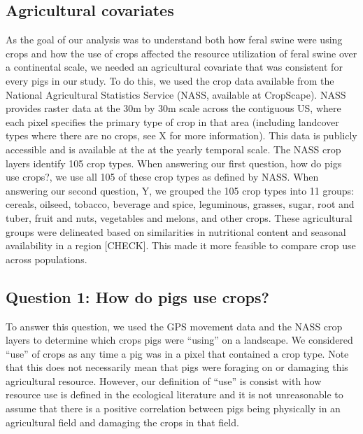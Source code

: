 \documentclass[a4paper]{article}
\begin{document}
\subsection*{Agricultural covariates}

As the goal of our analysis was to understand both how feral swine were using crops and how the use of crops affected the resource utilization of feral swine over a continental scale, we needed an agricultural covariate that was consistent for every pigs in our study.  To do this, we used the crop data available from the National Agricultural Statistics Service (NASS, available at CropScape). NASS provides raster data at the 30m by 30m scale across the contiguous US, where each pixel specifies the primary type of crop in that area (including landcover types where there are no crops, see X for more information). This data is publicly accessible and is available at the at the yearly temporal scale.  The NASS crop layers identify 105 crop types. When answering our first question, how do pigs use crops?, we use all 105 of these crop types as defined by NASS.  When answering our second question, Y, we grouped the 105 crop types into 11 groups: cereals, oilseed, tobacco, beverage and spice, leguminous, grasses, sugar, root and tuber, fruit and nuts, vegetables and melons, and other crops.  These agricultural groups were delineated based on similarities in nutritional content and seasonal availability in a region [CHECK].  This made it more feasible to compare crop use across populations.

\subsection*{Question 1: How do pigs use crops?}

To answer this question, we used the GPS movement data and the NASS crop layers to determine which crops pigs were ``using'' on a landscape. We considered ``use'' of crops as any time a pig was in a pixel that contained a crop type. Note that this does not necessarily mean that pigs were foraging on or damaging this agricultural resource.  However, our definition of ``use'' is consist with how resource use is defined in the ecological literature \citep{Hooten2017a} and it is not unreasonable to assume that there is a positive correlation between pigs being physically in an agricultural field and damaging the crops in that field.  
\end{document}
